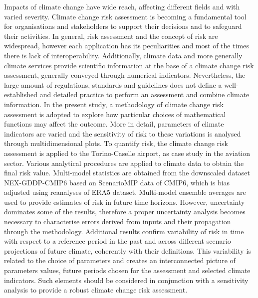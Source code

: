 Impacts of climate change have wide reach, affecting different fields and with varied severity. Climate change risk assessment is becoming a fundamental tool for organisations and stakeholders to support their decisions and to safeguard their activities. In general, risk assessment and the concept of risk are widespread, however each application has its peculiarities and most of the times there is lack of interoperability. Additionally, climate data and more generally climate services provide scientific information at the base of a climate change risk assessment, generally conveyed through numerical indicators. Nevertheless, the large amount of regulations, standards and guidelines does not define a well-established and detailed practice to perform an assessment and combine climate information.
In the present study, a methodology of climate change risk assessment is adopted to explore how particular choices of mathematical functions may affect the outcome. More in detail, parameters of climate indicators are varied and the sensitivity of risk to these variations is analysed through multidimensional plots.
To quantify risk, the climate change risk assessment is applied to the Torino-Caselle airport, as case study in the aviation sector. Various analytical procedures are applied to climate data to obtain the final risk value. Multi-model statistics are obtained from the downscaled dataset NEX-GDDP-CMIP6 based on ScenarioMIP data of CMIP6, which is bias adjusted using reanalyses of ERA5 dataset. Multi-model ensemble averages are used to provide estimates of risk in future time horizons. However, uncertainty dominates some of the results, therefore a proper uncertainty analysis becomes necessary to characterise errors derived from inputs and their propagation through the methodology.
Additional results confirm variability of risk in time with respect to a reference period in the past and across different scenario projections of future climate, coherently with their definitions. This variability is related to the choice of parameters and creates an interconnected picture of parameters values, future periods chosen for the assessment and selected climate indicators. Such elements should be considered in conjunction with a sensitivity analysis to provide a robust climate change risk assessment.
